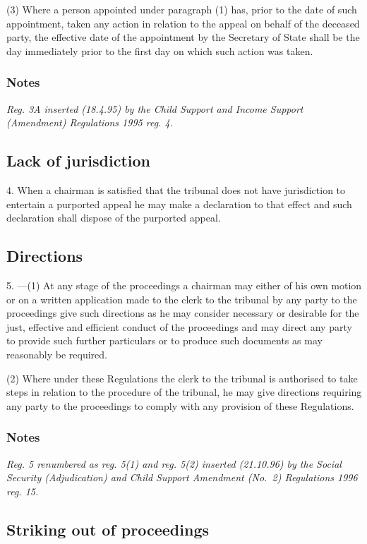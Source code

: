 \documentclass[a4paper]{article}
\newcommand\amendment[1]{\subsubsection*{Notes}{\itshape\frenchspacing\footnotesize #1 \par}}
\begin{document}
(3) Where a person appointed under paragraph (1) has, prior to the date of such appointment, taken any action in relation to the appeal on behalf of the deceased party, the effective date of the appointment by the Secretary of State shall be the day immediately prior to the first day on which such action was taken.

\amendment{
Reg. 3A inserted (18.4.95) by the Child Support and Income Support (Amendment) Regulations 1995 reg. 4.
}

\subsection[4. Lack of jurisdiction]{Lack of jurisdiction}

4.  When a chairman is satisfied that the tribunal does not have jurisdiction to entertain a purported appeal he may make a declaration to that effect and such declaration shall dispose of the purported appeal.

\subsection[5. Directions]{Directions}

5.%
---(1)  %
  At any stage of the proceedings a chairman may either of his own motion or on a written application made to the clerk to the tribunal by any party to the proceedings give such directions as he may consider necessary or desirable for the just, effective and efficient conduct of the proceedings and may direct any party to provide such further particulars or to produce such documents as may reasonably be required.

(2) Where under these Regulations the clerk to the tribunal is authorised to take steps in relation to the procedure of the tribunal, he may give directions requiring any party to the proceedings to comply with any provision of these Regulations.

\amendment{
Reg. 5 renumbered as reg. 5(1) and reg. 5(2) inserted (21.10.96) by the Social Security (Adjudication) and Child Support Amendment (No.\ 2) Regulations 1996 reg. 15.
}

\subsection[6. Striking out of proceedings]{Striking out of proceedings}
\end{document}
